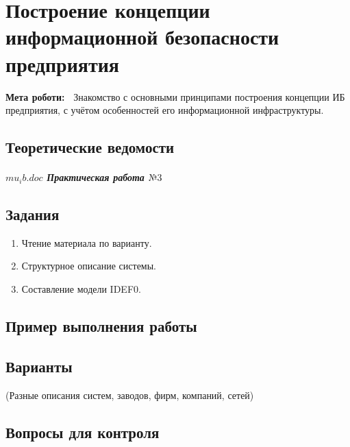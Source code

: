 \chapter{Построение концепции информационной безопасности предприятия} \label{chapt4}%
\textbf{Мета роботи:~}%
Знакомство с основными принципами построения концепции ИБ предприятия, с
учётом особенностей его информационной инфраструктуры.
\section{Теоретические ведомости} \label{sect3_a}

\paragraph{$mu_ib.doc$ Практическая работа $№ 3$}



\section{Задания}\label{sect3_b}
%
\begin{enumerate}
  \item Чтение материала по варианту.
  \item Структурное описание системы.
  \item Составление модели IDEF0.
\end{enumerate}
\section{Пример выполнения работы}\label{sect3_c}
%
\section{Варианты}\label{sect3_d}
%
(Разные описания систем, заводов, фирм, компаний, сетей)
\section{Вопросы для контроля}\label{sect3_e}
%
